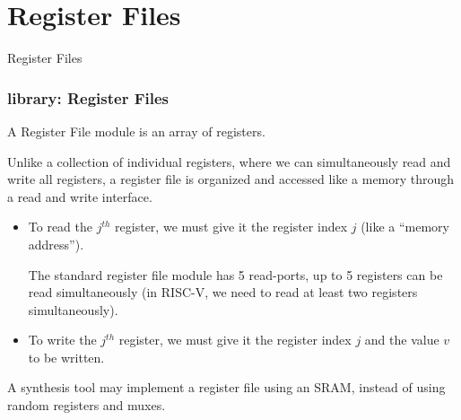 
\section{Register Files}


\begin{frame}

\begin{center}
  {\LARGE Register Files}
\end{center}

\end{frame}


\begin{frame}[fragile]
\frametitle{{\BSV} library: Register Files}

\footnotesize

A Register File module is an array of registers.

\vspace{4ex}

Unlike a collection of individual registers, where we can
simultaneously read and write all registers, a register file is
organized and accessed like a memory through a read and write
interface.

\vspace{2ex}

\begin{itemize}

 \item To read the $j^{th}$ register, we must give it the register
       index $j$ (like a ``memory address'').

       The standard {\BSV} register file module has 5 read-ports,
       {\ie} up to 5 registers can be read simultaneously (in RISC-V,
       we need to read at least two registers simultaneously).

 \PAUSE{\vspace{2ex}}

 \item To write the $j^{th}$ register, we must give it the register
       index $j$ and the value $v$ to be written.

\end{itemize}

\PAUSE{\vspace{2ex}}

A synthesis tool may implement a register file using an SRAM, instead
of using random registers and muxes.

\end{frame}

